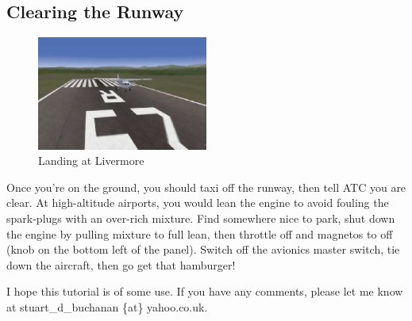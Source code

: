 \subsection{Clearing the Runway}

\begin{figure}[!htp]
\centering
\includegraphics[width=0.5\textwidth]{landing}
\caption{Landing at Livermore}
\end{figure}

Once you're on the ground, you should taxi off the runway, then tell 
ATC you are clear. At high-altitude airports, you would lean the engine to 
avoid fouling the spark-plugs with an over-rich mixture. 
Find somewhere nice to park, shut down the engine by pulling mixture to full lean, 
then throttle off and magnetos to off (knob on the bottom left of the panel). 
Switch off the avionics master switch, tie down the aircraft, then go get that hamburger!

I hope this tutorial is of some use. If you have any comments, 
please let me know at stuart\_d\_buchanan \{at\} yahoo.co.uk.
